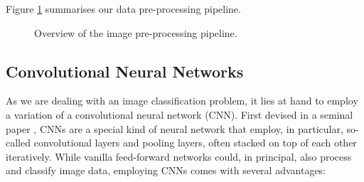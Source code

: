 \documentclass[british,12p]{article}
\begin{document}
    	Figure \ref{fig-preprocessing} summarises our data pre-processing pipeline. 
    	
    	\begin{figure}[h!]
			\begin{center}
  				\caption{Overview of the image pre-processing pipeline.}
  				\label{fig-preprocessing}
  			\end{center}
		\end{figure}
    	
    	
    \subsection{Convolutional Neural Networks}\label{secCNN}
    As we are dealing with an image classification problem, it lies at hand to employ a variation of a convolutional neural network (CNN). First devised in a seminal paper , CNNs are a special kind of neural network that employ, in particular, so-called convolutional layers and pooling layers, often stacked on top of each other iteratively. While vanilla feed-forward networks could, in principal, also process and classify image data, employing CNNs comes with several advantages:
\end{document}

